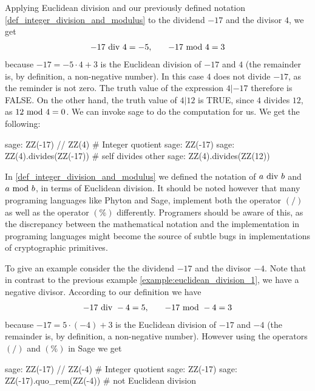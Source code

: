 \begin{example}
\label{example:euclidean_division_1}
 Applying Euclidean division and our previously defined notation \ref{def_integer_division_and_modulus} to the dividend $-17$ and the divisor $4$, we get 
\begin{equation*}
\begin{array}{lcr}
-17 \text{ div } 4 = - 5, & & -17 \text{ mod } 4 = 3
\end{array}
\end{equation*}
because $ -17 = -5 \cdot 4 + 3 $  is the Euclidean division of $-17$ and $4$ (the remainder is, by definition, a non-negative number). In this case $4$ does not divide $-17$, as the reminder is not zero. The truth value of the expression $4 | -17 $ therefore is FALSE. On the other hand, the truth value of $4 | 12$ is TRUE, since $4$ divides $12$, as $ 12 \text{ mod } 4 = 0 $. We can invoke sage to do the computation for us. We get the following:
\begin{sagecommandline}
sage: ZZ(-17) // ZZ(4) # Integer quotient 
sage: ZZ(-17) %
sage: ZZ(4).divides(ZZ(-17)) # self divides other
sage: ZZ(4).divides(ZZ(12))
\end{sagecommandline}
\end{example}
\begin{remark} In \ref{def_integer_division_and_modulus} we defined the notation of  $a \text{ div } b$ and $a \text{ mod } b$, in terms of Euclidean division. It should be noted however that many programing languages like Phyton and Sage, implement both the operator $(/)$ as well as the operator $(\%)$ differently. Programers should be aware of this, as the discrepancy between the mathematical notation and the implementation in programing languages might become the source of subtle bugs in implementations of cryptographic primitives.   

To give an example consider the the dividend $-17$ and the divisor $-4$. Note that in contrast to the previous example \ref{example:euclidean_division_1}, we have a negative divisor. According to our definition we have
\begin{equation*}
\begin{array}{lcr}
-17 \text{ div } -4 = 5, & & -17 \text{ mod } -4 = 3
\end{array}
\end{equation*}
because $ -17 = 5 \cdot (-4) + 3 $  is the Euclidean division of $-17$ and $-4$ (the remainder is, by definition, a non-negative number). However using the operators $(/)$ and $(\%)$ in Sage we get
\begin{sagecommandline}
sage: ZZ(-17) // ZZ(-4) # Integer quotient 
sage: ZZ(-17) %
sage: ZZ(-17).quo_rem(ZZ(-4)) # not Euclidean division 
\end{sagecommandline}
\end{remark}


